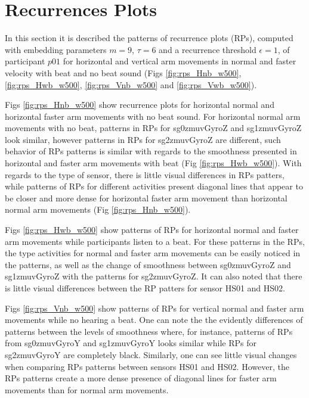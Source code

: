 \newpage
\section{Recurrences Plots}
In this section it is described the patterns of recurrence plots (RPs), 
computed with embedding parameters $m=9$, $\tau=6$ and a recurrence 
threshold $\epsilon=1$, of participant $p01$ for horizontal and vertical 
arm movements in normal and faster velocity with beat and no beat 
sound (Figs \ref{fig:rps_Hnb_w500}, 
\ref{fig:rps_Hwb_w500}, \ref{fig:rps_Vnb_w500} and \ref{fig:rps_Vwb_w500}).

Figs \ref{fig:rps_Hnb_w500} show recurrence plots for horizontal normal
and horizontal faster arm movements with no beat sound. 
For horizontal normal arm movements with no beat, patterns in 
RPs for sg0zmuvGyroZ and sg1zmuvGyroZ look similar, however
patterns in RPs for sg2zmuvGyroZ are different,
such behavior of RPs patterns is similar with regards to the smoothness 
presented in horizontal and faster arm movements with beat
(Fig \ref{fig:rps_Hwb_w500}).
With regards to the type of sensor, there is little visual differences in 
RPs patters, while patterns of RPs for different activities present diagonal 
lines that appear to be closer and more dense for horizontal faster 
arm movement than horizontal normal arm movements (Fig \ref{fig:rps_Hnb_w500}).

Figs \ref{fig:rps_Hwb_w500} show patterns of RPs for horizontal normal
and faster arm movements while participants listen to a beat. 
For these patterns in the RPs, the type activities for normal and 
faster arm movements can be easily noticed in the patterns,
as well as the change of smoothness between sg0zmuvGyroZ and sg1zmuvGyroZ
with the patterns for sg2zmuvGyroZ. It can also noted that there is 
little visual differences between the RP patters for sensor HS01 and HS02.

Figs \ref{fig:rps_Vnb_w500} show patterns of RPs for vertical normal
and faster arm movements while no hearing a beat. One can note the 
the evidently differences of patterns between the levels of smoothness 
where, for instance, patterns of RPs from sg0zmuvGyroY and sg1zmuvGyroY 
looks similar while RPs for sg2zmuvGyroY are completely black.
Similarly, one can see little visual changes when comparing RPs patterns 
between sensors HS01 and HS02. 
However, the RPs patterns create a more dense presence of diagonal lines
for faster arm movements than for normal arm movements. 

